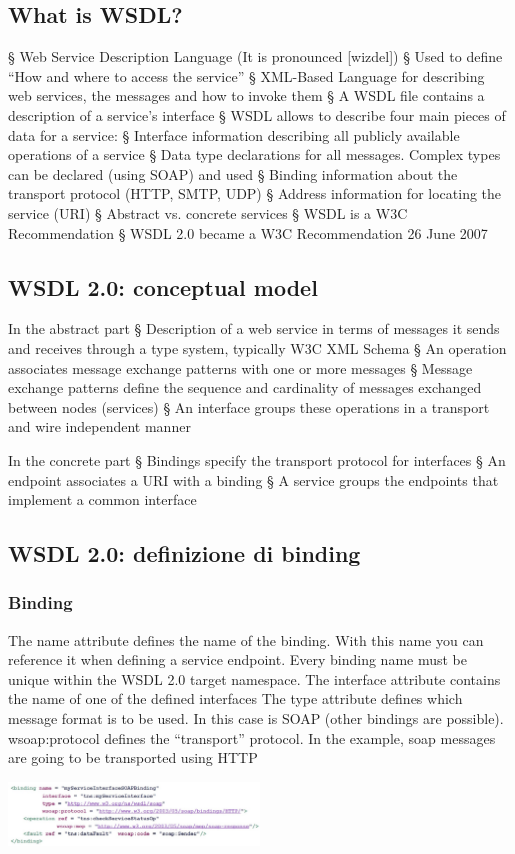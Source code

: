 \subsection{What is WSDL?}
§ Web Service Description Language (It is pronounced [wizdel])
§ Used to define “How and where to access the service”
§ XML-Based Language for describing web services, the messages and how to invoke them
§ A WSDL file contains a description of a service’s interface
§ WSDL allows to describe four main pieces of data for a service:
§ Interface information describing all publicly available operations of a service
§ Data type declarations for all messages. Complex types can be declared (using SOAP) and used
§ Binding information about the transport protocol (HTTP, SMTP, UDP)
§ Address information for locating the service (URI)
§ Abstract vs. concrete services
§ WSDL is a W3C Recommendation
§ WSDL 2.0 became a W3C Recommendation 26 June 2007

\subsection{WSDL 2.0: conceptual model}
In the abstract part
§ Description of a web service in terms of messages it sends and
receives through a type system, typically W3C XML Schema
§ An operation associates message exchange patterns with one
or more messages
§ Message exchange patterns define the sequence and
cardinality of messages exchanged between nodes (services)
§ An interface groups these operations in a transport and wire
independent manner

In the concrete part
§ Bindings specify the transport protocol for interfaces
§ An endpoint associates a URI with a binding
§ A service groups the endpoints that implement a common
interface

\subsection{WSDL 2.0: definizione di binding}
\subsubsection{Binding}
The name attribute defines the name of the binding. With this name you can reference it when defining a service endpoint. Every binding name must be
unique within the WSDL 2.0 target namespace.
The interface attribute contains the name of one of the defined interfaces
The type attribute defines which message format is to be used. In this case is SOAP (other bindings are possible).
wsoap:protocol defines the “transport” protocol. In the example, soap messages are going to be transported using HTTP
\begin{center}
    \includegraphics[width=0.5\textwidth]{img/SoapServices7.jpg}
\end{center}

